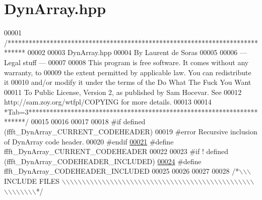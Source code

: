 \hypertarget{a00092_source}{\section{Dyn\+Array.\+hpp}
\label{a00092_source}
}

\begin{DoxyCode}
00001 \textcolor{comment}{/*****************************************************************************}
00002 \textcolor{comment}{}
00003 \textcolor{comment}{        DynArray.hpp}
00004 \textcolor{comment}{        By Laurent de Soras}
00005 \textcolor{comment}{}
00006 \textcolor{comment}{--- Legal stuff ---}
00007 \textcolor{comment}{}
00008 \textcolor{comment}{This program is free software. It comes without any warranty, to}
00009 \textcolor{comment}{the extent permitted by applicable law. You can redistribute it}
00010 \textcolor{comment}{and/or modify it under the terms of the Do What The Fuck You Want}
00011 \textcolor{comment}{To Public License, Version 2, as published by Sam Hocevar. See}
00012 \textcolor{comment}{http://sam.zoy.org/wtfpl/COPYING for more details.}
00013 \textcolor{comment}{}
00014 \textcolor{comment}{*Tab=3***********************************************************************/}
00015 
00016 
00017 
00018 \textcolor{preprocessor}{#if defined (ffft\_DynArray\_CURRENT\_CODEHEADER)}
00019 \textcolor{preprocessor}{    #error Recursive inclusion of DynArray code header.}
00020 \textcolor{preprocessor}{#endif}
\hypertarget{a00092_source_l00021}{}\hyperlink{a00092_ad74efcb6a9d581885aa6775982c07997}{00021} \textcolor{preprocessor}{#define ffft\_DynArray\_CURRENT\_CODEHEADER}
00022 
00023 \textcolor{preprocessor}{#if ! defined (ffft\_DynArray\_CODEHEADER\_INCLUDED)}
\hypertarget{a00092_source_l00024}{}\hyperlink{a00092_a86200f79a6a46453b3f096c370e0ae16}{00024} \textcolor{preprocessor}{#define ffft\_DynArray\_CODEHEADER\_INCLUDED}
00025 
00026 
00027 
00028 \textcolor{comment}{/*\(\backslash\)\(\backslash\)\(\backslash\) INCLUDE FILES \(\backslash\)\(\backslash\)\(\backslash\)\(\backslash\)\(\backslash\)\(\backslash\)\(\backslash\)\(\backslash\)\(\backslash\)\(\backslash\)\(\backslash\)\(\backslash\)\(\backslash\)\(\backslash\)\(\backslash\)\(\backslash\)\(\backslash\)\(\backslash\)\(\backslash\)\(\backslash\)\(\backslash\)\(\backslash\)\(\backslash\)\(\backslash\)\(\backslash\)\(\backslash\)\(\backslash\)\(\backslash\)\(\backslash\)\(\backslash\)\(\backslash\)\(\backslash\)\(\backslash\)\(\backslash\)\(\backslash\)\(\backslash\)\(\backslash\)\(\backslash\)\(\backslash\)\(\backslash\)\(\backslash\)\(\backslash\)\(\backslash\)\(\backslash\)\(\backslash\)\(\backslash\)\(\backslash\)\(\backslash\)\(\backslash\)\(\backslash\)\(\backslash\)\(\backslash\)\(\backslash\)\(\backslash\)\(\backslash\)\(\backslash\)*/}

\end{DoxyCode}
